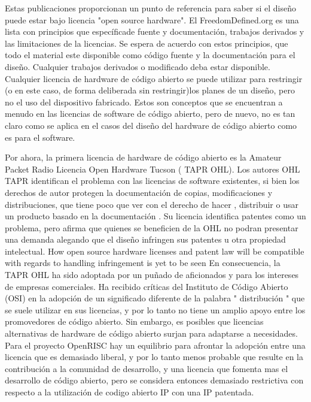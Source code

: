 Estas publicaciones proporcionan un punto de referencia para saber si el diseño puede estar bajo licencia "open source hardware".
El FreedomDefined.org es una lista con principios que específicade  fuente y  documentación, trabajos derivados y las limitaciones de la licencias. Se espera de acuerdo con estos principios, que todo el material este disponible como código fuente y la documentación para el diseño. Cualquier trabajos derivados o modificado deba estar disponible. 
Cualquier licencia de hardware de código abierto se puede utilizar para restringir (o en este caso, de forma deliberada sin restringir)los planes de un diseño, pero no el uso del dispositivo fabricado. Estos son conceptos que se encuentran a menudo en las licencias de software de código abierto, pero de nuevo, no es tan claro como se aplica en el casos del diseño del hardware de código abierto como es para el software. 

Por ahora, la primera licencia de hardware de código abierto es la  Amateur Packet Radio Licencia Open Hardware Tucson ( TAPR OHL). Los autores OHL TAPR identifican el problema con las licencias de software existentes, si bien los derechos de autor protegen la documentación de copias, modificaciones y distribuciones, que tiene poco que ver con el derecho de hacer , distribuir o usar un producto basado en la documentación \cite{Etiqueta12}.
Su licencia identifica patentes como un problema, pero afirma que quienes se beneficien de la OHL no podran
presentar una demanda alegando que el diseño infringen sus patentes u otra propiedad intelectual.
How open source hardware licenses and patent law will be compatible with regards to handling infringement is yet to be seen
En consecuencia, la TAPR OHL ha sido adoptada por un puñado de aficionados y para los intereses de empresas comerciales. Ha recibido críticas
del Instituto de Código Abierto (OSI) en la adopción de un significado diferente de la  palabra " distribución " que se suele utilizar en sus licencias, y por lo tanto no tiene un amplio apoyo entre los promovedores de código abierto\cite{Etiqueta13}. 
Sin embargo, es posibles que licencias alternativas de hardware de código abierto surjan para adaptarse a necesidades.
Para el proyecto OpenRISC hay un equilibrio para afrontar la adopción entre una licencia que es demasiado liberal, y por lo tanto menos probable que resulte en la contribución a la comunidad de desarrollo, y una licencia que fomenta mas el desarrollo de código abierto, pero se considera entonces demasiado restrictiva con respecto a la utilización de codigo abierto IP con una IP patentada.

